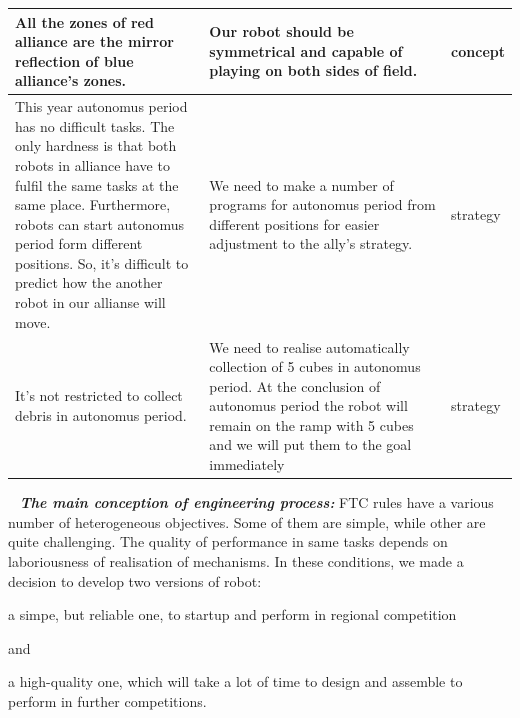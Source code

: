 \begin{table}[H]
\begin{center}
\begin{tabular}{|p{0.4\linewidth}|p{0.5\linewidth}|p{0.1\linewidth}|}
				\hline
				All the zones of red alliance are the mirror reflection of blue alliance's zones. & Our robot should be symmetrical and capable of playing on both sides of field. & concept \\
				\hline
				This year autonomus period has no difficult tasks. The only hardness is that both robots in alliance have to fulfil the same tasks at the same place. Furthermore, robots can start autonomus period form different positions. So, it's difficult to predict how the another robot in our allianse will move. & We need to make a number of programs for autonomus period from different positions for easier adjustment to the ally's strategy. & strategy \\
				\hline
				It's not restricted to collect debris in autonomus period. & We need to realise automatically collection of 5 cubes in autonomus period. At the conclusion of autonomus period the robot will remain on the ramp with 5 cubes and we will put them to the goal immediately & strategy \\
				\hline
			\end{tabular}
		\end{center}
	\end{table}
	
	 \newline
	\textit{\textbf{The main conception of engineering process:}} FTC rules have a various number of heterogeneous objectives. Some of them are simple, while other are quite challenging. The quality of performance in same tasks depends on laboriousness of realisation of mechanisms. \newline
	In these conditions, we made a decision to develop two versions of robot:
	\begin{enumerate*}
		\item a simpe, but reliable one, to startup and perform in regional competition
		
		and
		
		\item a high-quality one, which will take a lot of time to design and assemble to perform in further competitions.
		
	\end{enumerate*}
	
